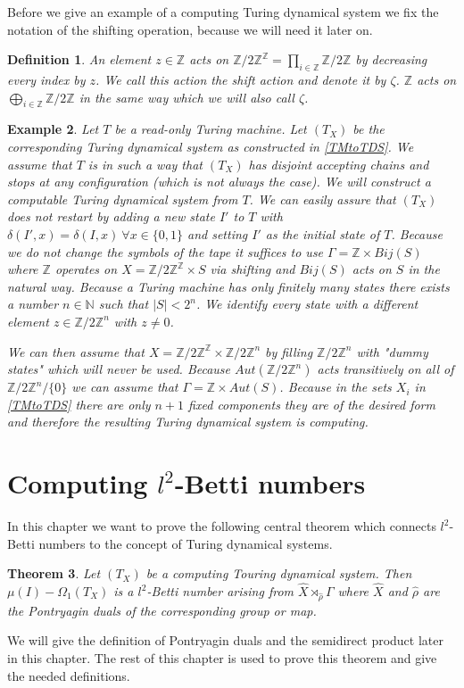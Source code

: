 \documentclass[12pt,a4paper]{scrartcl}
\newtheorem{Theorem}{Theorem}[section]
\newtheorem{Definition}[Theorem]{Definition}
\newtheorem{Example}[Theorem]{Example}
\numberwithin{equation}{section}
\newcommand{\Z}{\mathbb{Z}} %
\newcommand{\N}{\mathbb{N}} %
\newcommand{\2}{\mathbb{Z} / 2 \mathbb{Z}}
\newcommand{\1}{\bar{1}}
\newcommand{\0}{\bar{0}}
\begin{document}
Before we give an example of a computing Turing dynamical system we fix the notation of the shifting operation, because we will need it later on.
\begin{Definition} \label{shift}
	An element $z \in \Z$ acts on $\2^{\Z} = \prod_{i \in \Z} \2$ by decreasing every index by $z$. We call this action the shift action and denote it by $\zeta$. $\Z$ acts on $\bigoplus_{i \in \Z} \2$ in the same way which we will also call $\zeta$.
\end{Definition}
\begin{Example} \label{roTMtoTDS}
	Let $T$ be a read-only Turing machine. Let $(T_X)$ be the corresponding Turing dynamical system as constructed in \ref{TMtoTDS}. We assume that $T$ is in such a way that $(T_X)$ has disjoint accepting chains and stops at any configuration (which is not always the case). We will construct a computable Turing dynamical system from $T$.  We can easily assure that $(T_X)$ does not restart by adding a new state $I'$ to $T$ with $\delta(I', x) = \delta(I, x) \ \forall x \in \{0,1\}$ and setting $I'$ as the initial state of $T$. Because we do not change the symbols of the tape it suffices to use $\Gamma = \Z \times Bij(S)$ where $\Z$ operates on $X = \2^\Z \times S$ via shifting and $Bij(S)$ acts on $S$ in the natural way. Because a Turing machine has only finitely many states there exists a number $n \in \N$ such that $|S| < 2^n$. We identify every state with a different element $z \in \2^n$ with $z \neq 0$.
	
	 We can then assume that $X = \2^\Z \times \2^n$ by filling $\2^n$ with "dummy states" which will never be used. Because $Aut(\2^n)$ acts transitively on all of $\2^n / \{0\}$ we can assume that $\Gamma = \Z \times Aut(S)$. Because in the sets $X_i$ in \ref{TMtoTDS} there are only $n+1$ fixed components they are of the desired form and therefore the resulting Turing dynamical system is computing.
\end{Example}


\section{Computing $l^2$-Betti numbers}
In this chapter we want to prove the following central theorem which connects $l^2$-Betti numbers to the concept of Turing dynamical systems.
\begin{Theorem} \label{HS}
	Let $(T_X)$ be a computing Touring dynamical system. Then $\mu (I) - \Omega_1(T_X)$ is a $l^2$-Betti number arising from $\hat{X} \rtimes_{\hat{\rho}} \Gamma$ where $\hat{X}$ and $\hat{\rho}$ are the Pontryagin duals of the corresponding group or map.
\end{Theorem}
We will give the definition of Pontryagin duals and the semidirect product later in this chapter. The rest of this chapter is used to prove this theorem and give the needed definitions.
\end{document}
